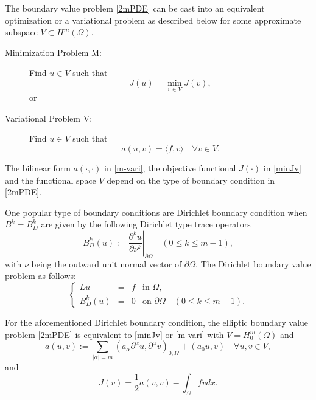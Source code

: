 The boundary value problem \eqref{2mPDE} can be cast into an
equivalent optimization or a variational problem as described below for some approximate subspace $V\subset H^m(\Omega)$.
\begin{description}
\item[Minimization Problem M:] Find $u\in V$ such that 
\begin{equation}
\label{minJv}
J(u)=\min_{v\in V} J(v),
\end{equation}
\noindent or
\item[Variational Problem V:]  Find  $u\in V$ such that 
\begin{equation}\label{m-vari} 
a(u,v) = \langle f, v\rangle \quad \forall v \in V.
\end{equation}
\end{description}
The bilinear form $a(\cdot,\cdot)$ in \eqref{m-vari}, the objective
functional $J(\cdot)$ in \eqref{minJv} and the functional space $V$
depend on the type of boundary condition in \eqref{2mPDE}. 

One popular type of boundary conditions are Dirichlet boundary
condition when $B^k=B_D^k$ are given by the following Dirichlet type
trace operators
\begin{equation}\label{BD}
B_D^k(u):=\left.\frac{\partial^k u}{\partial
    \nu^k}\right|_{\partial\Omega}\quad (0\le k\le m-1),
\end{equation}
with $\nu$ being the outward unit normal vector of $\partial\Omega$. The Dirichlet boundary
value problem as follows:
\begin{equation} \label{m-BD}
\left\{
  \begin{array}{rccl}\displaystyle
Lu &=& f &\mbox{in }\Omega, \\
B_{D}^k(u) &= &0 & \mbox{on }\partial\Omega \quad(0\le k\le m-1).
  \end{array}
\right.
\end{equation}


For the aforementioned Dirichlet boundary condition, the elliptic
boundary value problem \eqref{2mPDE} is equivalent to \eqref{minJv} or
\eqref{m-vari} with $V=H^m_0(\Omega)$ and 
\begin{equation}
  \label{auv}
a(u,v) := \sum_{|\alpha | = m}(a_\alpha\partial^{\alpha}u, \partial^{\alpha}v)_{0,\Omega} +(a_0u,v)\quad \forall
u, v \in V,
\end{equation}
and 
\begin{equation}
  \label{Jv}
J(v)=\frac12 a(v,v) -\int_{\Omega} fv dx.  
\end{equation}

